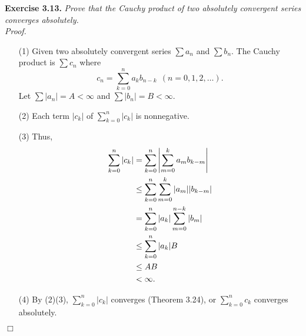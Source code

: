 \documentclass{article}
\begin{document}



\textbf{Exercise 3.13.}
\emph{Prove that the Cauchy product of two absolutely convergent series
converges absolutely.} \\

\emph{Proof.}
\begin{enumerate}
\item[(1)]
Given two absolutely convergent series $\sum a_n$ and $\sum b_n$.
The Cauchy product is $\sum c_n$
where
$$c_n = \sum_{k=0}^{n} a_k b_{n-k} \:\: (n=0,1,2,\ldots).$$
Let $\sum |a_n| = A < \infty$ and $\sum |b_n| = B < \infty$.
\item[(2)]
Each term $|c_k|$ of $\sum_{k=0}^{n}|c_k|$ is nonnegative.
\item[(3)]
Thus,
\begin{align*}
  \sum_{k=0}^{n}|c_k|
  &= \sum_{k=0}^{n} \abs{ \sum_{m=0}^{k} a_m b_{k-m} } \\
  &\leq \sum_{k=0}^{n} \sum_{m=0}^{k} |a_m| |b_{k-m}| \\
  &= \sum_{k=0}^{n} |a_k| \sum_{m=0}^{n-k} |b_m| \\
  &\leq \sum_{k=0}^{n} |a_k| B \\
  &\leq AB \\
  &< \infty.
\end{align*}
\item[(4)]
By (2)(3), $\sum_{k=0}^{n}|c_k|$ converges (Theorem 3.24),
or $\sum_{k=0}^{n} c_k$ converges absolutely.
\end{enumerate}
$\Box$ \\\\



\end{document}
